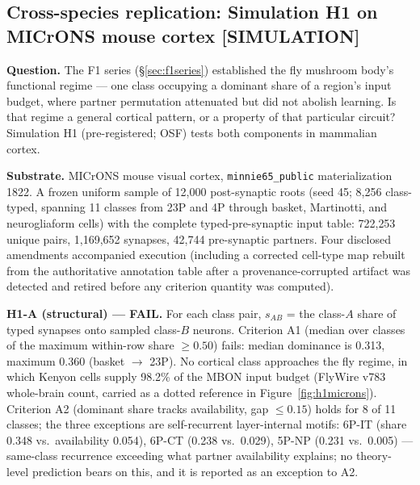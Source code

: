 \documentclass[11pt,twocolumn]{article}
\theoremstyle{plain}
\begin{document}
\subsection{Cross-species replication: Simulation H1 on MICrONS mouse cortex [SIMULATION]}
\label{sec:h1microns}

\textbf{Question.} The F1 series (\S\ref{sec:f1series}) established the
fly mushroom body's functional regime --- one class occupying a dominant
share of a region's input budget, where partner permutation attenuated
but did not abolish learning. Is that regime a general cortical pattern,
or a property of that particular circuit? Simulation H1 (pre-registered;
OSF) tests both components in mammalian cortex.

\textbf{Substrate.} MICrONS mouse visual cortex,
\texttt{minnie65\_public} materialization 1822. A frozen uniform sample
of 12{,}000 post-synaptic roots (seed 45; 8{,}256 class-typed, spanning
11 classes from 23P and 4P through basket, Martinotti, and neurogliaform
cells) with the complete typed-pre-synaptic input table: 722{,}253 unique
pairs, 1{,}169{,}652 synapses, 42{,}744 pre-synaptic partners. Four
disclosed amendments accompanied execution (including a corrected
cell-type map rebuilt from the authoritative annotation table after a
provenance-corrupted artifact was detected and retired before any
criterion quantity was computed).

\textbf{H1-A (structural) --- FAIL.} For each class pair, $s_{AB}$ = the
class-$A$ share of typed synapses onto sampled class-$B$ neurons.
Criterion A1 (median over classes of the maximum within-row share $\geq
0.50$) fails: median dominance is 0.313, maximum 0.360 (basket $\to$
23P). No cortical class approaches the fly regime, in which Kenyon cells
supply 98.2\% of the MBON input budget (FlyWire v783 whole-brain count,
carried as a dotted reference in Figure~\ref{fig:h1microns}). Criterion
A2 (dominant share tracks availability, gap $\leq 0.15$) holds for 8 of
11 classes; the three exceptions are self-recurrent layer-internal
motifs: 6P-IT (share 0.348 vs.\ availability 0.054), 6P-CT (0.238 vs.\
0.029), 5P-NP (0.231 vs.\ 0.005) --- same-class recurrence exceeding what
partner availability explains; no theory-level prediction bears on this, and it is
reported as an exception to A2.
\end{document}
